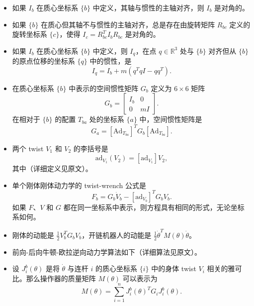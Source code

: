 \documentclass[12pt,a4paper]{article}
\begin{document}
\begin{itemize}
\item 如果 $I_b$ 在质心坐标系 $\{b\}$ 中定义，其轴与惯性的主轴对齐，则 $I_b$ 是对角的。

\item 如果 $\{b\}$ 在质心但其轴不与惯性的主轴对齐，总是存在由旋转矩阵 $R_{bc}$ 定义的旋转坐标系 $\{c\}$，使得 $I_c = R_{bc}^T I_b R_{bc}$ 是对角的。

\item 如果 $I_b$ 在质心坐标系 $\{b\}$ 中定义，则 $I_q$，在点 $q \in \mathbb{R}^3$ 处与 $\{b\}$ 对齐但从 $\{b\}$ 的原点位移的坐标系 $\{q\}$ 中的惯性，是
\begin{equation}
I_q = I_b + m(q^T qI - qq^T).
\end{equation}

\item 在质心坐标系 $\{b\}$ 中表示的空间惯性矩阵 $G_b$ 定义为 $6 \times 6$ 矩阵
\begin{equation}
G_b = \begin{bmatrix} I_b & 0 \\ 0 & mI \end{bmatrix}.
\end{equation}
在相对于 $\{b\}$ 的配置 $T_{ba}$ 处的坐标系 $\{a\}$ 中，空间惯性矩阵是
\begin{equation}
G_a = [\text{Ad}_{T_{ba}}]^T G_b [\text{Ad}_{T_{ba}}].
\end{equation}

\item 两个 twist $V_1$ 和 $V_2$ 的李括号是
\begin{equation}
\text{ad}_{V_1}(V_2) = [\text{ad}_{V_1}]V_2,
\end{equation}
其中（详细定义见原文）。

\item 单个刚体刚体动力学的 twist-wrench 公式是
\begin{equation}
F_b = G_b \dot{V}_b - [\text{ad}_{V_b}]^T G_b V_b.
\end{equation}
如果 $F$、$V$ 和 $G$ 都在同一坐标系中表示，则方程具有相同的形式，无论坐标系如何。

\item 刚体的动能是 $\frac{1}{2}V_b^T G_b V_b$，开链机器人的动能是 $\frac{1}{2}\dot{\theta}^T M(\theta)\dot{\theta}$。

\item 前向-后向牛顿-欧拉逆向动力学算法如下（详细算法见原文）。

\item 设 $J_i^b(\theta)$ 是将 $\dot{\theta}$ 与连杆 $i$ 的质心坐标系 $\{i\}$ 中的身体 twist $V_i$ 相关的雅可比。那么操作器的质量矩阵 $M(\theta)$ 可以表示为
\begin{equation}
M(\theta) = \sum_{i=1}^{n} J_i^b(\theta)^T G_i J_i^b(\theta).
\end{equation}


\end{itemize}
\end{document}
